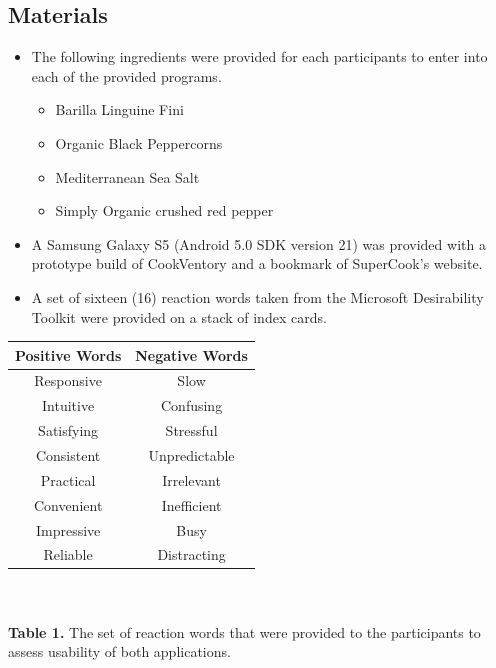 \documentclass{sigchi}
\begin{document}
\subsection{Materials}
\begin{itemize}
	\item The following ingredients were provided for each participants to enter into each of the provided programs.
	\begin{itemize}
		\item Barilla Linguine Fini
		\item Organic Black Peppercorns
		\item Mediterranean Sea Salt
		\item Simply Organic crushed red pepper
	\end{itemize}
	\item A Samsung Galaxy S5 (Android 5.0 SDK version 21) was provided with a prototype build of CookVentory and a bookmark of SuperCook's website.
	\item A set of sixteen (16) reaction words taken from the Microsoft Desirability Toolkit \cite{microsofttoolkit} were provided on a stack of index cards.
\end{itemize}
\begin{center}
\begin{tabular}{ |c|c| }
	\hline
		Positive Words & Negative Words \\ 
	\hline
		Responsive & Slow \\
		Intuitive & Confusing \\
		Satisfying & Stressful \\
		Consistent & Unpredictable \\
		Practical & Irrelevant \\
		Convenient & Inefficient \\
		Impressive & Busy \\
		Reliable & Distracting \\
 	\hline
\end{tabular}
\\~\\
\textbf{Table 1.} The set of reaction words that were provided to the participants to assess usability of both applications.
\end{center}
\end{document}
